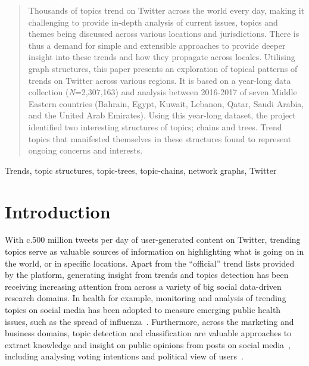 \documentclass[conference]{IEEEtran}
\begin{document}
\begin{abstract}
Thousands of topics trend on Twitter across the world every day,
making it challenging to provide in-depth analysis of current issues,
topics and themes being discussed across various locations and
jurisdictions. There is thus a demand for simple and extensible
approaches to provide deeper insight into these trends and how they
propagate across locales. Utilising graph structures, this paper
presents an exploration of topical patterns of trends on Twitter
across various regions. It is based on a year-long data collection
({\emph{N}}=2,307,163) and analysis between 2016-2017 of seven Middle
Eastern countries (Bahrain, Egypt, Kuwait, Lebanon, Qatar, Saudi
Arabia, and the United Arab Emirates). Using this year-long dataset,
the project identified two interesting structures of topics; chains
and trees. Trend topics that manifested themselves in these structures
found to represent ongoing concerns and interests.
\end{abstract}

\begin{IEEEkeywords}
Trends, topic structures, topic-trees, topic-chains, network graphs, Twitter
\end{IEEEkeywords}

\section{Introduction}\label{intro}

With c.500 million tweets per day of user-generated content on
Twitter, trending topics serve as valuable sources of information on
highlighting what is going on in the world, or in specific
locations. Apart from the ``official'' trend lists provided by the
platform, generating insight from trends and topics detection has been
receiving increasing attention from across a variety of big social
data-driven research domains. In health for example, monitoring and
analysis of trending topics on social media has been adopted to
measure emerging public health issues, such as the spread of
influenza~\cite{Achrekar2011,Parker2015}. Furthermore, across the
marketing and business domains, topic detection and classification are
valuable approaches to extract knowledge and insight on public
opinions from posts on social
media~\cite{blamey-et-al-2012,blamey-et-al-2013,Bello2013,mostafa-et-al-ai2016,albishry-et-al:ssei2018},
including analysing voting intentions and political view of
users~\cite{Fang2015}.
\end{document}

